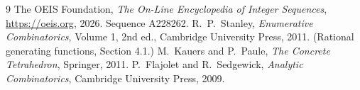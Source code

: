 \documentclass[11pt,a4paper]{article}
\theoremstyle{plain}
\theoremstyle{definition}
\begin{document}
\begin{thebibliography}{9}
 The OEIS Foundation, \emph{The On-Line Encyclopedia of Integer
Sequences}, \url{https://oeis.org}, 2026. Sequence A228262.
 R.~P.~Stanley, \emph{Enumerative Combinatorics}, Volume 1, 2nd ed.,
Cambridge University Press, 2011. (Rational generating functions, Section 4.1.)
 M.~Kauers and P.~Paule, \emph{The Concrete Tetrahedron}, Springer, 2011.
 P.~Flajolet and R.~Sedgewick, \emph{Analytic Combinatorics}, Cambridge
University Press, 2009.
\end{thebibliography}
\end{document}
